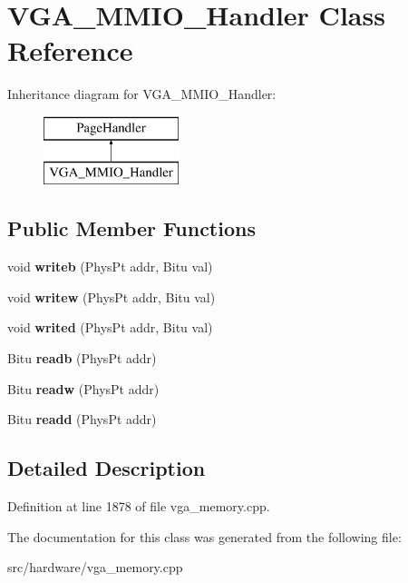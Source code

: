 \hypertarget{classVGA__MMIO__Handler}{\section{V\-G\-A\-\_\-\-M\-M\-I\-O\-\_\-\-Handler Class Reference}
\label{classVGA__MMIO__Handler}
}
Inheritance diagram for V\-G\-A\-\_\-\-M\-M\-I\-O\-\_\-\-Handler\-:\begin{figure}[H]
\begin{center}
\leavevmode
\includegraphics[height=2.000000cm]{classVGA__MMIO__Handler}
\end{center}
\end{figure}
\subsection*{Public Member Functions}
\begin{DoxyCompactItemize}
\item 
\hypertarget{classVGA__MMIO__Handler_a779662658a576ce1bd9aa3179e424495}{void {\bfseries writeb} (Phys\-Pt addr, Bitu val)}\label{classVGA__MMIO__Handler_a779662658a576ce1bd9aa3179e424495}

\item 
\hypertarget{classVGA__MMIO__Handler_a25ce81cdbb53959e45187ab1ac650cb2}{void {\bfseries writew} (Phys\-Pt addr, Bitu val)}\label{classVGA__MMIO__Handler_a25ce81cdbb53959e45187ab1ac650cb2}

\item 
\hypertarget{classVGA__MMIO__Handler_a60397669cf87d269153e5d1554cc16c4}{void {\bfseries writed} (Phys\-Pt addr, Bitu val)}\label{classVGA__MMIO__Handler_a60397669cf87d269153e5d1554cc16c4}

\item 
\hypertarget{classVGA__MMIO__Handler_aefab83f4a14d5626418aa371839e426f}{Bitu {\bfseries readb} (Phys\-Pt addr)}\label{classVGA__MMIO__Handler_aefab83f4a14d5626418aa371839e426f}

\item 
\hypertarget{classVGA__MMIO__Handler_a96360a3e09a8373dcb7a01266b3aa82e}{Bitu {\bfseries readw} (Phys\-Pt addr)}\label{classVGA__MMIO__Handler_a96360a3e09a8373dcb7a01266b3aa82e}

\item 
\hypertarget{classVGA__MMIO__Handler_a4fed3f110d17dda1ffb040a0e979f5cc}{Bitu {\bfseries readd} (Phys\-Pt addr)}\label{classVGA__MMIO__Handler_a4fed3f110d17dda1ffb040a0e979f5cc}

\end{DoxyCompactItemize}


\subsection{Detailed Description}


Definition at line 1878 of file vga\-\_\-memory.\-cpp.



The documentation for this class was generated from the following file\-:\begin{DoxyCompactItemize}
\item 
src/hardware/vga\-\_\-memory.\-cpp\end{DoxyCompactItemize}
